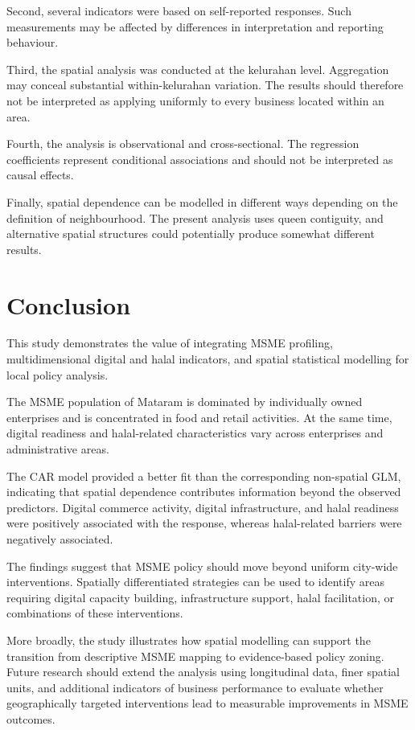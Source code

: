 \documentclass[
  default,
]{sn-jnl}
\begin{document}
Second, several indicators were based on self-reported responses. Such
measurements may be affected by differences in interpretation and
reporting behaviour.

Third, the spatial analysis was conducted at the kelurahan level.
Aggregation may conceal substantial within-kelurahan variation. The
results should therefore not be interpreted as applying uniformly to
every business located within an area.

Fourth, the analysis is observational and cross-sectional. The
regression coefficients represent conditional associations and should
not be interpreted as causal effects.

Finally, spatial dependence can be modelled in different ways depending
on the definition of neighbourhood. The present analysis uses queen
contiguity, and alternative spatial structures could potentially produce
somewhat different results.

\section{Conclusion}\label{conclusion}

This study demonstrates the value of integrating MSME profiling,
multidimensional digital and halal indicators, and spatial statistical
modelling for local policy analysis.

The MSME population of Mataram is dominated by individually owned
enterprises and is concentrated in food and retail activities. At the
same time, digital readiness and halal-related characteristics vary
across enterprises and administrative areas.

The CAR model provided a better fit than the corresponding non-spatial
GLM, indicating that spatial dependence contributes information beyond
the observed predictors. Digital commerce activity, digital
infrastructure, and halal readiness were positively associated with the
response, whereas halal-related barriers were negatively associated.

The findings suggest that MSME policy should move beyond uniform
city-wide interventions. Spatially differentiated strategies can be used
to identify areas requiring digital capacity building, infrastructure
support, halal facilitation, or combinations of these interventions.

More broadly, the study illustrates how spatial modelling can support
the transition from descriptive MSME mapping to evidence-based policy
zoning. Future research should extend the analysis using longitudinal
data, finer spatial units, and additional indicators of business
performance to evaluate whether geographically targeted interventions
lead to measurable improvements in MSME outcomes.
\end{document}
